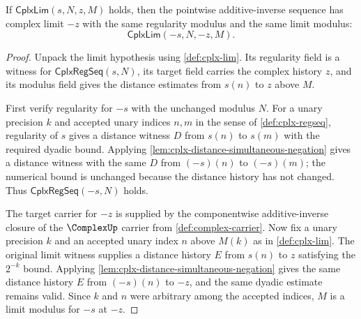 \begin{theorem}
\label{thm:cplx-lim-pointwise-negation}
If $\mathsf{CplxLim}(s,N,z,M)$ holds, then the pointwise additive-inverse sequence has complex limit $-z$ with the same regularity modulus and the same limit modulus:
$$
\mathsf{CplxLim}(-s,N,-z,M).
$$
\end{theorem}
\begin{proof}
Unpack the limit hypothesis using \autoref{def:cplx-lim}. Its regularity field is a witness for $\mathsf{CplxRegSeq}(s,N)$, its target field carries the complex history $z$, and its modulus field gives the distance estimates from $s(n)$ to $z$ above $M$.

First verify regularity for $-s$ with the unchanged modulus $N$. For a unary precision $k$ and accepted unary indices $n,m$ in the sense of \autoref{def:cplx-regseq}, regularity of $s$ gives a distance witness $D$ from $s(n)$ to $s(m)$ with the required dyadic bound. Applying \autoref{lem:cplx-distance-simultaneous-negation} gives a distance witness with the same $D$ from $(-s)(n)$ to $(-s)(m)$; the numerical bound is unchanged because the distance history has not changed. Thus $\mathsf{CplxRegSeq}(-s,N)$ holds.

The target carrier for $-z$ is supplied by the componentwise additive-inverse closure of the $\ComplexUp$ carrier from \autoref{def:complex-carrier}. Now fix a unary precision $k$ and an accepted unary index $n$ above $M(k)$ as in \autoref{def:cplx-lim}. The original limit witness supplies a distance history $E$ from $s(n)$ to $z$ satisfying the $2^{-k}$ bound. Applying \autoref{lem:cplx-distance-simultaneous-negation} gives the same distance history $E$ from $(-s)(n)$ to $-z$, and the same dyadic estimate remains valid. Since $k$ and $n$ were arbitrary among the accepted indices, $M$ is a limit modulus for $-s$ at $-z$.
\end{proof}
